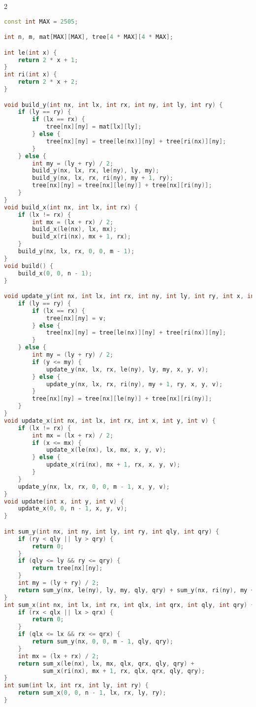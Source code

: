 \documentclass[11pt, a4paper, oneside]{book}
\begin{document}
\begin{multicols}{2}
\begin{lstlisting}[language=C++]
const int MAX = 2505;

int n, m, mat[MAX][MAX], tree[4 * MAX][4 * MAX];

int le(int x) {
    return 2 * x + 1;
}
int ri(int x) {
    return 2 * x + 2;
}

void build_y(int nx, int lx, int rx, int ny, int ly, int ry) {
    if (ly == ry) {
        if (lx == rx) {
            tree[nx][ny] = mat[lx][ly];
        } else {
            tree[nx][ny] = tree[le(nx)][ny] + tree[ri(nx)][ny];
        }
    } else {
        int my = (ly + ry) / 2;
        build_y(nx, lx, rx, le(ny), ly, my);
        build_y(nx, lx, rx, ri(ny), my + 1, ry);
        tree[nx][ny] = tree[nx][le(ny)] + tree[nx][ri(ny)];
    }
}
void build_x(int nx, int lx, int rx) {
    if (lx != rx) {
        int mx = (lx + rx) / 2;
        build_x(le(nx), lx, mx);
        build_x(ri(nx), mx + 1, rx);
    }
    build_y(nx, lx, rx, 0, 0, m - 1);
}
void build() {
    build_x(0, 0, n - 1);
}

void update_y(int nx, int lx, int rx, int ny, int ly, int ry, int x, int y, int v) {
    if (ly == ry) {
        if (lx == rx) {
            tree[nx][ny] = v;
        } else {
            tree[nx][ny] = tree[le(nx)][ny] + tree[ri(nx)][ny];
        }
    } else {
        int my = (ly + ry) / 2;
        if (y <= my) {
            update_y(nx, lx, rx, le(ny), ly, my, x, y, v);
        } else {
            update_y(nx, lx, rx, ri(ny), my + 1, ry, x, y, v);
        }
        tree[nx][ny] = tree[nx][le(ny)] + tree[nx][ri(ny)];
    }
}
void update_x(int nx, int lx, int rx, int x, int y, int v) {
    if (lx != rx) {
        int mx = (lx + rx) / 2;
        if (x <= mx) {
            update_x(le(nx), lx, mx, x, y, v);
        } else {
            update_x(ri(nx), mx + 1, rx, x, y, v);
        }
    }
    update_y(nx, lx, rx, 0, 0, m - 1, x, y, v);
}
void update(int x, int y, int v) {
    update_x(0, 0, n - 1, x, y, v);
}

int sum_y(int nx, int ny, int ly, int ry, int qly, int qry) {
    if (ry < qly || ly > qry) {
        return 0;
    }
    if (qly <= ly && ry <= qry) {
        return tree[nx][ny];
    }
    int my = (ly + ry) / 2;
    return sum_y(nx, le(ny), ly, my, qly, qry) + sum_y(nx, ri(ny), my + 1, ry, qly, qry);
}
int sum_x(int nx, int lx, int rx, int qlx, int qrx, int qly, int qry) {
    if (rx < qlx || lx > qrx) {
        return 0;
    }
    if (qlx <= lx && rx <= qrx) {
        return sum_y(nx, 0, 0, m - 1, qly, qry);
    }
    int mx = (lx + rx) / 2;
    return sum_x(le(nx), lx, mx, qlx, qrx, qly, qry) +
           sum_x(ri(nx), mx + 1, rx, qlx, qrx, qly, qry);
}
int sum(int lx, int rx, int ly, int ry) {
    return sum_x(0, 0, n - 1, lx, rx, ly, ry);
}
\end{lstlisting}
\end{multicols}
\end{document}
